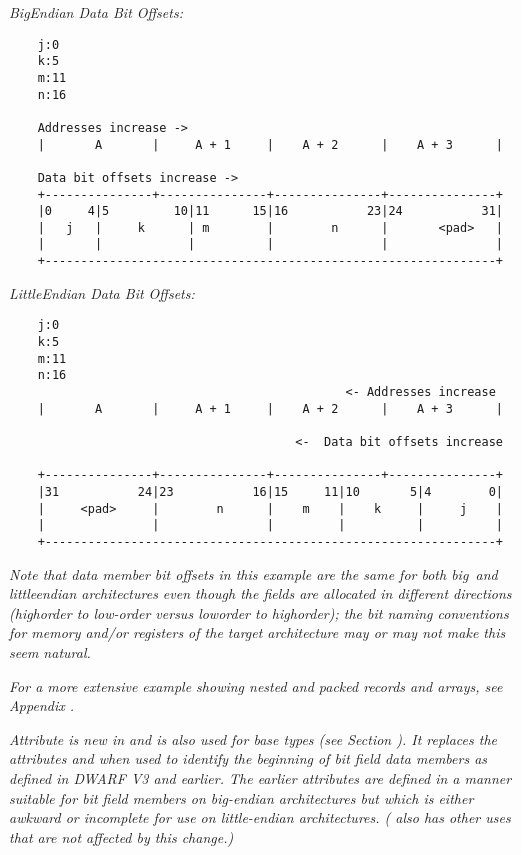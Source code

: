 \textit{Big\dash Endian Data Bit Offsets:}

\begin{verbatim}
    j:0
    k:5
    m:11
    n:16

    Addresses increase ->
    |       A       |     A + 1     |    A + 2      |    A + 3      | 

    Data bit offsets increase ->
    +---------------+---------------+---------------+---------------+
    |0     4|5         10|11      15|16           23|24           31|
    |   j   |     k      | m        |        n      |       <pad>   |
    |       |            |          |               |               | 
    +---------------------------------------------------------------+ 
\end{verbatim}

\textit{Little\dash  Endian Data Bit Offsets:}
\begin{verbatim}
    j:0
    k:5
    m:11
    n:16
                                               <- Addresses increase
    |       A       |     A + 1     |    A + 2      |    A + 3      | 

                                        <-  Data bit offsets increase 

    +---------------+---------------+---------------+---------------+
    |31           24|23           16|15     11|10       5|4        0|
    |     <pad>     |        n      |    m    |    k     |     j    |
    |               |               |         |          |          |
    +---------------------------------------------------------------+

\end{verbatim}

\textit{Note that data member bit offsets in this example are the
same for both big\dash\ and little\dash endian architectures even
though the fields are allocated in different directions
(high\dash order to low-order versus low\dash order to high\dash order);
the bit naming conventions for memory and/or registers of
the target architecture may or may not make this seem natural.}

\textit{For a more extensive example showing nested and packed records
and arrays, see 
Appendix .}

\textit{Attribute  
is new in 
and is also used for base types 
(see Section 
). 
It replaces the
attributes  and
 when used to
identify the beginning of bit field data members as defined
in DWARF V3 and earlier. The earlier attributes are defined
in a manner suitable for bit field members on big-endian
architectures but which is either awkward or incomplete for
use on little-endian architectures.  
( also
has other uses that are not affected by this change.)}

